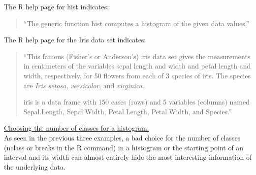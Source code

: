 \documentclass[12pt,letterpaper,final]{article}
\begin{document}
\newpage


The R help page for hist indicates:
\begin{quotation}
``The generic function hist computes a histogram of the given data values.''
\end{quotation}


The R help page for the Iris data set indicates:
\begin{quotation}
``This famous (Fisher's or Anderson's) iris data set gives the measurements 
in centimeters of the variables sepal length and width and petal length and width, 
respectively, for 50 flowers from each of 3 species of iris. The species 
are {\it Iris setosa}, {\it versicolor}, and {\it virginica}.

iris is a data frame with 150 cases (rows) and 5 variables (columns) named 
Sepal.Length, Sepal.Width, Petal.Length, Petal.Width, and Species.''
\end{quotation}


\noindent
\underline{Choosing the number of classes for a histogram:} \\
As seen in the previous three examples, a bad choice for the number
of classes (nclass or breaks in the R command) in a histogram 
or the starting point of an interval and its width
can almost entirely hide the most
interesting information of the underlying data.
\end{document}
